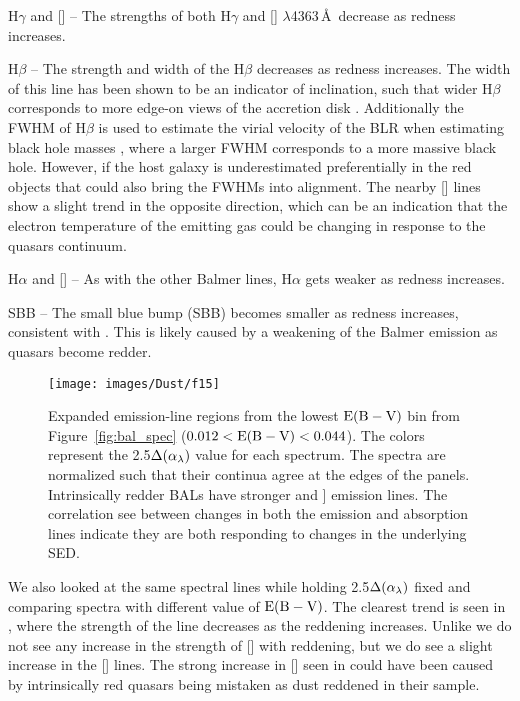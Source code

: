 H$\gamma$ and [] -- The strengths of both H$\gamma$ and [] $\lambda$4363\,\AA\ decrease as redness increases.

H$\beta$ -- The strength and width of the H$\beta$ decreases as redness increases. The width of this line has been shown to be an indicator of inclination, such that wider H$\beta$ corresponds to more edge-on views of the accretion disk \citep{Wills:1986}.  Additionally the FWHM of H$\beta$ is used to estimate the virial velocity of the BLR when estimating black hole masses \citep[e.g.]{Vestergaard:2006}, where a larger FWHM corresponds to a more massive black hole. However, if the host galaxy is underestimated preferentially in the red objects that could also bring the FWHMs into alignment.
The nearby [] lines show a slight trend in the opposite direction, which can be an indication that the electron temperature of the emitting gas could be changing in response to the quasars continuum. 

H$\alpha$ and [] -- As with the other Balmer lines, H$\alpha$ gets weaker as redness increases.

SBB -- The small blue bump (SBB) becomes smaller as redness increases, consistent with \citet{Richards:2003}. This is likely caused by a weakening of the Balmer emission as quasars become redder. 

\begin{figure}[t]
\begin{center}
\texttt{[image: images/Dust/f15]}
\caption[Expanded emission-line regions for BAL quasars]{\label{fig:ind_bal_spec} Expanded emission-line regions from the lowest ${\rm E(B-V)}$ bin from Figure~\ref{fig:bal_spec} ($0.012<{\rm E(B-V)}<0.044$). The colors represent the 2.5$\Delta(\alpha_{\lambda})$ value for each spectrum.  The spectra are normalized such that their continua agree at the edges of the panels. Intrinsically redder BALs have stronger  and ] emission lines.  The correlation see between changes in both the emission and absorption lines indicate they are both responding to changes in the underlying SED.}
\end{center}
\end{figure}

We also looked at the same spectral lines while holding 2.5$\Delta(\alpha_{\lambda})$ fixed and comparing spectra with different value of ${\rm E(B-V)}$.  The clearest trend is seen in , where the strength of the line decreases as the reddening increases.  Unlike \citet{Richards:2003} we do not see any increase in the strength of [] with reddening, but we do see a slight increase in the [] lines. The strong increase in [] seen in \citet{Richards:2003} could have been caused by intrinsically red quasars being mistaken as dust reddened in their sample.

